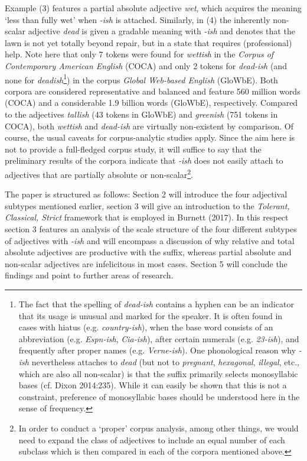 \documentclass[output=paper
,modfonts
,nonflat]{langsci/langscibook}
\begin{document}
Example (3) features a partial absolute adjective  \textit{wet}, which acquires the meaning `less than fully wet' when \textit{-ish} is attached. Similarly, in (4) the inherently non-scalar adjective \textit{dead} is given a gradable meaning with \textit{-ish} and denotes that the lawn is not yet totally beyond repair, but in a state that requires (professional) help. Note here that only 7 tokens were found for \textit{wettish} in the \textit{Corpus of Contemporary American English} (COCA) and only 2 tokens for \textit{dead-ish} (and none for \textit{deadish}\footnote{The fact that the spelling of \textit{dead-ish} contains a hyphen can be an indicator that its usage is unusual and marked for the speaker. It is often found in cases with hiatus (e.g. \textit{country-ish}), when the base word consists of an abbreviation (e.g. \textit{Espn-ish}, \textit{Cia-ish}), after certain numerals (e.g. \textit{23-ish}), and frequently after proper names (e.g. \textit{Verne-ish}). One phonological reason why \textit{-ish} nevertheless attaches to \textit{dead} (but not to \textit{pregnant}, \textit{hexagonal}, \textit{illegal}, etc., which are also all non-scalar) is that the suffix primarily selects monosyllabic bases (cf. Dixon 2014:235). While it can easily be shown that this is not a constraint, preference of monosyllabic bases should be understood here in the sense of frequency.}) in the corpus \textit{Global Web-based English} (GloWbE). Both corpora are considered representative and balanced and feature 560 million words (COCA) and a considerable 1.9 billion words (GloWbE), respectively. Compared to the adjectives \textit{tallish} (43 tokens in GloWbE) and \textit{greenish} (751 tokens in COCA), both \textit{wettish} and \textit{dead-ish} are virtually non-existent by comparison. Of course, the usual caveats for corpus-analytic studies apply. Since the aim here is not to provide a full-fledged corpus study, it will suffice to say that the preliminary results of the corpora indicate that \textit{-ish} does not easily attach to adjectives that are partially absolute or non-scalar\footnote{In order to conduct a `proper' corpus analysis, among other things, we would need to expand the class of adjectives to include an equal number of each subclass which is then compared in each of the corpora mentioned above.}.

The paper is structured as follows: Section 2 will introduce the four adjectival subtypes mentioned earlier, section 3 will give an introduction to the \textit{Tolerant, Classical, Strict} framework that is employed in Burnett (2017). In this respect section 3 features an analysis of the scale structure of the four different subtypes of adjectives with \textit{-ish} and will encompass a discussion of why relative and total absolute adjectives are productive with the suffix, whereas partial absolute and non-scalar adjectives are infelicitous in most cases. Section 5 will conclude the findings and point to further areas of research.
\end{document}
